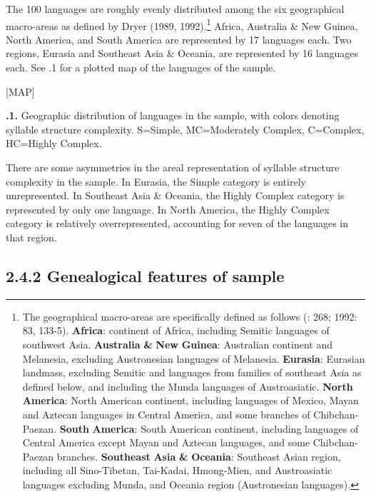   The 100 languages are roughly evenly distributed among the six geographical macro-areas as defined by Dryer (1989, 1992).\footnote{ \textrm{The geographical macro-areas are specifically defined as follows (\citealt{Dryer1989}: 268; 1992: 83, 133-5).} \textrm{\textbf{Africa}}\textrm{: continent of Africa, including Semitic languages of southwest Asia.} \textrm{\textbf{Australia} \textbf{\&} \textbf{New} \textbf{Guinea}}\textrm{: Australian continent and Melanesia, excluding Austronesian languages of Melanesia.} \textrm{\textbf{Eurasia}}\textrm{: Eurasian landmass, excluding Semitic and languages from families of southeast Asia as defined below, and including the Munda languages of Austroasiatic.} \textrm{\textbf{North} \textbf{America}}\textrm{: North American continent, including languages of Mexico, Mayan and Aztecan languages in Central America, and some branches of Chibchan-Paezan.} \textrm{\textbf{South} \textbf{America}}\textrm{: South American continent, including languages of Central America except Mayan and Aztecan languages, and some Chibchan-Paezan branches.} \textrm{\textbf{Southeast} \textbf{Asia} \textbf{\&} \textbf{Oceania}}\textrm{: Southeast Asian region, including all Sino-Tibetan, Tai-Kadai, Hmong-Mien, and Austroasiatic languages excluding Munda, and Oceania region (Austronesian languages).}} Africa, Australia \& New Guinea, North America, and South America are represented by 17 languages each. Two regions, Eurasia and Southeast Asia \& Oceania, are represented by 16 languages each. See .1 for a plotted map of the languages of the sample.

[MAP]

\textbf{.1.} Geographic distribution of languages in the sample, with colors denoting syllable structure complexity. S=Simple, MC=Moderately Complex, C=Complex, HC=Highly Complex.

  There are some asymmetries in the areal representation of syllable structure complexity in the sample. In Eurasia, the Simple category is entirely unrepresented. In Southeast Asia \& Oceania, the Highly Complex category is represented by only one language. In North America, the Highly Complex category is relatively overrepresented, accounting for seven of the languages in that region.

\subsection{2.4.2 Genealogical features of sample}

